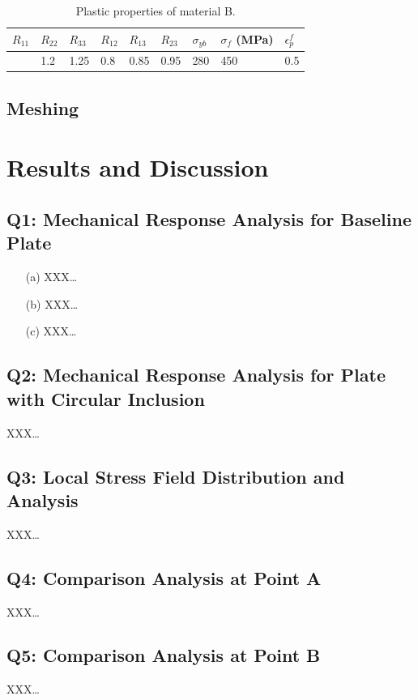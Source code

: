 \documentclass[12pt]{article}
\begin{document}
\begin{table}[H]
    \centering
    \caption{Plastic properties of material B.}
    \label{tab:materialB-plasticproperties}
    \begin{tabular}{lllllllll}
        \toprule
            \centering $R_{11}$ & $R_{22}$ & $R_{33}$ & $R_{12}$ & $R_{13}$ & $R_{23}$ & $\sigma_{yb}$ & 
            $\sigma_{f}$ (MPa) & $\epsilon_{p}^{f}$  \\
            \midrule
            \centering 1 & 1.2 & 1.25 & 0.8 & 0.85 & 0.95 & 280 & 450 & 0.5 \\
            \bottomrule
    \end{tabular}
\end{table}
\subsection{Meshing}
\section*{Results and Discussion}

\subsection*{Q1: Mechanical Response Analysis for Baseline Plate}
\begin{itemize}
    \item[(a)] XXX…
    \item[(b)] XXX…
    \item[(c)] XXX…
\end{itemize}

\subsection*{Q2: Mechanical Response Analysis for Plate with Circular Inclusion}
XXX…

\subsection*{Q3: Local Stress Field Distribution and Analysis}
XXX…

\subsection*{Q4: Comparison Analysis at Point A}
XXX…

\subsection*{Q5: Comparison Analysis at Point B}
XXX…
\end{document}
